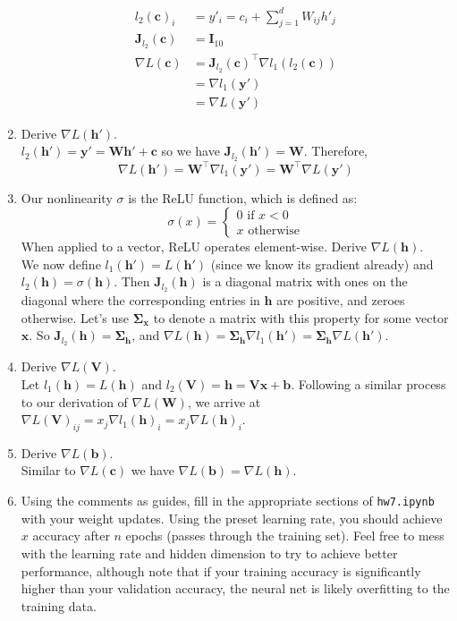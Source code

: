 \documentclass{article}
\begin{document}
\begin{enumerate}[label=\arabic*.]
{\begin{align*}
		l_2(\mathbf{c})_i  &= y'_i = c_i + \sum_{j=1}^d W_{ij}h'_j\\
		\mathbf{J}_{l_2}(\mathbf{c}) &= \mathbf{I}_{10}\\
		\nabla L(\mathbf{c}) &= \mathbf{J}_{l_2}(\mathbf{c})^\top\nabla l_1(l_2(\mathbf{c}))\\
		&= \nabla l_1(\mathbf{y'})\\
		&= \nabla L(\mathbf{y'})
		\end{align*}
	}
\item Derive $\nabla L(\mathbf{h'})$.\\
	{\color{blue} $l_2(\mathbf{h'}) = \mathbf{y'} = \mathbf{Wh' + c}$ so we have $\mathbf{J}_{l_2}(\mathbf{h'}) = \mathbf{W}$. Therefore,
		$$\nabla L(\mathbf{h'}) = \mathbf{W}^\top \nabla l_1(\mathbf{y'}) = \mathbf{W}^\top\nabla L(\mathbf{y'})$$
	}
\item Our nonlinearity $\sigma$ is the ReLU function, which is defined as: $$ \sigma(x) = \begin{cases} 0 \text{ if } x < 0 \\ x \text{ otherwise} \end{cases}$$ When applied to a vector, ReLU operates element-wise. Derive $\nabla L(\mathbf{h})$.\\
	{\color{blue} We now define $l_1(\mathbf{h'}) = L(\mathbf{h'})$ (since we know its gradient already) and $l_2(\mathbf{h}) = \sigma(\mathbf{h})$. Then $\mathbf{J}_{l_2}(\mathbf{h})$ is a diagonal matrix with ones on the diagonal where the corresponding entries in $\mathbf{h}$ are positive, and zeroes otherwise. Let's use $\mathbf{\Sigma_x}$ to denote a matrix with this property for some vector $\mathbf{x}$. So $\mathbf{J}_{l_2}(\mathbf{h}) = \mathbf{\Sigma_h}$, and $\nabla L(\mathbf{h}) = \mathbf{\Sigma_h}\nabla l_1(\mathbf{h'}) = \mathbf{\Sigma_h}\nabla L(\mathbf{h'})$.}
\item Derive $\nabla L(\mathbf{V})$.\\
	{\color{blue} Let $l_1(\mathbf{h}) = L(\mathbf{h})$ and $l_2(\mathbf{V}) = \mathbf{h} = \mathbf{Vx + b}$. Following a similar process to our derivation of $\nabla L(\mathbf{W})$, we arrive at $\nabla L(\mathbf{V})_{ij} = x_j\nabla l_1(\mathbf{h})_i = x_j\nabla L(\mathbf{h})_i$.}
\item Derive $\nabla L(\mathbf{b})$.\\
	{\color{blue} Similar to $\nabla L(\mathbf{c})$ we have $\nabla L(\mathbf{b}) = \nabla L(\mathbf{h})$.}
\item Using the comments as guides, fill in the appropriate sections of \verb|hw7.ipynb| with your weight updates. Using the preset learning rate, you should achieve $x$ accuracy after $n$ epochs (passes through the training set). Feel free to mess with the learning rate and hidden dimension to try to achieve better performance, although note that if your training accuracy is significantly higher than your validation accuracy, the neural net is likely overfitting to the training data.
\end{enumerate}
\end{document}
